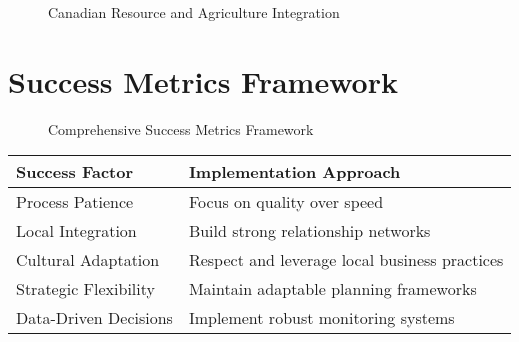 \begin{figure}[htbp]
    \centering
    \caption{Canadian Resource and Agriculture Integration}
    \label{fig:canadian-resource-framework}
\end{figure}

\section{Success Metrics Framework}\label{sec:success-metrics}

\begin{figure}[htbp]
    \centering
    \caption{Comprehensive Success Metrics Framework}
    \label{fig:success-metrics}
\end{figure}

\begin{tcolorbox}[colback=white,colframe=primarydark,title=\textbf{Success Factors Matrix}]
\begin{center}
\begin{tabularx}{\textwidth}{>{\raggedright\arraybackslash}X >{\raggedright\arraybackslash}X}
    \toprule
    \textbf{Success Factor} & \textbf{Implementation Approach} \\
    \midrule
    Process Patience & Focus on quality over speed \\
    Local Integration & Build strong relationship networks \\
    Cultural Adaptation & Respect and leverage local business practices \\
    Strategic Flexibility & Maintain adaptable planning frameworks \\
    Data-Driven Decisions & Implement robust monitoring systems \\
    \bottomrule
\end{tabularx}
\end{center}
\end{tcolorbox}

